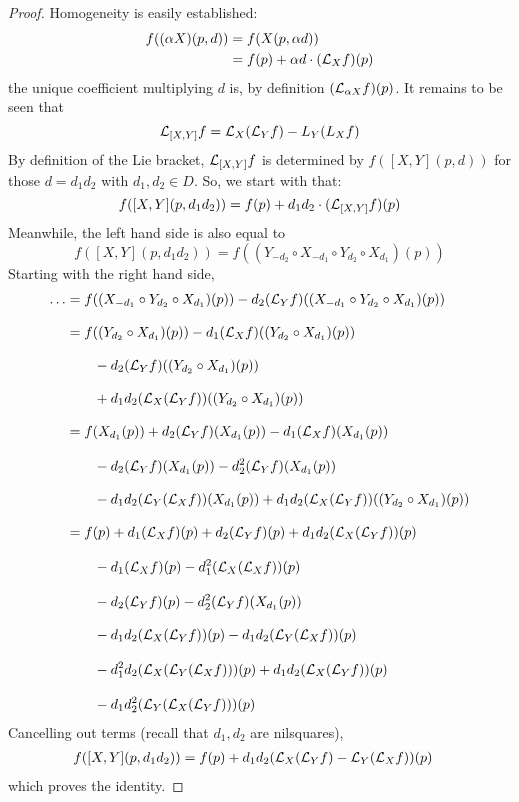 \begin{proof}
  Homogeneity is easily established:
  \begin{align*}
    f((\alpha X)(p,d)) &= f(X(p,\alpha d)) \\
                       &= f(p) + \alpha d\cdot(\mathcal L_Xf)(p)
  \end{align*}
  the unique coefficient multiplying \( d \) is, by definition \( (\mathcal L_{\alpha X}f)(p) \). It remains to be seen that
  \begin{equation*}
    \mathcal L_{[X,Y]}f = \mathcal L_X(\mathcal L_Yf) - L_Y(L_Xf)
  \end{equation*}
  By definition of the Lie bracket, \( \mathcal L_{[X,Y]}f \) is determined by \( f([X,Y](p,d)) \) for those \( d=d_1d_2 \) with \( d_1,d_2\in D \). So, we start with that:
  \begin{equation*}
    f([X,Y](p,d_1d_2)) = f(p) + d_1d_2\cdot(\mathcal L_{[X,Y]}f)(p)
  \end{equation*}
  Meanwhile, the left hand side is also equal to
  \begin{equation*}
    f([X,Y](p,d_1d_2)) = f((Y_{-d_2}\circ X_{-d_1}\circ Y_{d_2}\circ X_{d_1})(p))
  \end{equation*}
  Starting with the right hand side,
  \begin{align*}
    \dots &= f((X_{-d_1}\circ Y_{d_2}\circ X_{d_1})(p)) - d_2(\mathcal L_Yf)((X_{-d_1}\circ Y_{d_2}\circ X_{d_1})(p)) \\[2ex]
          &= f((Y_{d_2}\circ X_{d_1})(p)) - d_1(\mathcal L_Xf)((Y_{d_2}\circ X_{d_1})(p)) \\[2ex]
	  &\quad\quad - d_2(\mathcal L_Yf)((Y_{d_2}\circ X_{d_1})(p)) \\[2ex]
	  &\quad\quad + d_1d_2(\mathcal L_X(\mathcal L_Yf))((Y_{d_2}\circ X_{d_1})(p)) \\[2ex]
	  &= f(X_{d_1}(p)) + d_2(\mathcal L_Yf)(X_{d_1}(p)) - d_1(\mathcal L_Xf)(X_{d_1}(p)) \\[2ex]
	  &\quad\quad - d_2(\mathcal L_Yf)(X_{d_1}(p)) - d_2^2(\mathcal L_Yf)(X_{d_1}(p)) \\[2ex]
	  &\quad\quad - d_1d_2(\mathcal L_Y(\mathcal L_Xf))(X_{d_1}(p)) + d_1d_2(\mathcal L_X(\mathcal L_Yf))((Y_{d_2}\circ X_{d_1})(p)) \\[2ex]
	  &= f(p) + d_1(\mathcal L_Xf)(p) + d_2(\mathcal L_Yf)(p) + d_1d_2(\mathcal L_X(\mathcal L_Yf))(p) \\[2ex]
	  &\quad\quad - d_1(\mathcal L_Xf)(p) - d_1^2(\mathcal L_X(\mathcal L_Xf))(p) \\[2ex]
	  &\quad\quad - d_2(\mathcal L_Yf)(p) - d_2^2(\mathcal L_Yf)(X_{d_1}(p)) \\[2ex]
	  &\quad\quad - d_1d_2(\mathcal L_X(\mathcal L_Yf))(p) - d_1d_2(\mathcal L_Y(\mathcal L_Xf))(p) \\[2ex]
	  &\quad\quad - d_1^2d_2(\mathcal L_X(\mathcal L_Y(\mathcal L_Xf)))(p) + d_1d_2(\mathcal L_X(\mathcal L_Yf))(p) \\[2ex]
	  &\quad\quad - d_1d_2^2(\mathcal L_Y(\mathcal L_X(\mathcal L_Yf)))(p)
  \end{align*}
  Cancelling out terms (recall that \( d_1,d_2 \) are nilsquares),
  \begin{align*}
    f([X,Y](p,d_1d_2)) &= f(p) + d_1d_2(\mathcal L_X(\mathcal L_Yf) - \mathcal L_Y(\mathcal L_Xf))(p)
  \end{align*}
  which proves the identity.
\end{proof}

